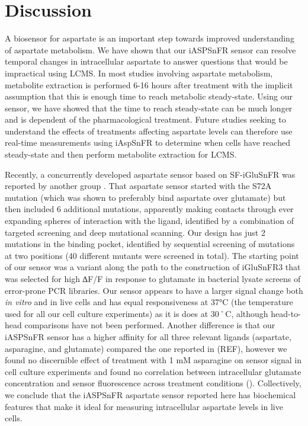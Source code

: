 \documentclass[9pt,lineno]{elife}
\begin{document}



\section{Discussion}
A biosensor for aspartate is an important step towards improved understanding of aspartate metabolism.
We have shown that our iASPSnFR sensor can resolve temporal changes in intracellular aspartate to answer questions that would be impractical using LCMS.
In most studies involving aspartate metabolism, metabolite extraction is performed 6-16 hours after treatment with the implicit assumption that this is enough time to reach metabolic steady-state.
Using our sensor, we have showed that the time to reach steady-state can be much longer and is dependent of the pharmacological treatment.
Future studies seeking to understand the effects of treatments affecting aspartate levels can therefore use real-time measurements using iAspSnFR to determine when cells have reached steady-state and then perform metabolite extraction for LCMS.

Recently, a concurrently developed aspartate sensor based on SF-iGluSnFR was reported by another group \citep{Hellweg2023}.
That aspartate sensor started with the S72A mutation (which was shown to preferably bind aspartate over glutamate) but then included 6 additional mutations, apparently making contacts through ever expanding spheres of interaction with the ligand, identified by a combination of targeted screening and deep mutational scanning.
Our design has just 2 mutations in the binding pocket, identified by sequential screening of mutations at two positions (40 different mutants were screened in total).
The starting point of our sensor was a variant along the path to the construction of iGluSnFR3 that was selected for high ∆F/F in response to glutamate in bacterial lysate screens of error-prone PCR libraries.
Our sensor appears to have a larger signal change both \textit{in vitro }and in live cells and has equal responsiveness at 37°C (the temperature used for all our cell culture experiments) as it is does at 30˚C, although head-to-head comparisons have not been performed.
Another difference is that our iASPSnFR sensor has a higher affinity for all three relevant ligands (aspartate, asparagine, and glutamate) compared the one reported in (REF), however we found no discernible effect of treatment with 1 mM asparagine on sensor signal in cell culture experiments and found no correlation between intracellular glutamate concentration and sensor fluorescence across treatment conditions ().
Collectively, we conclude that the iASPSnFR aspartate sensor reported here has biochemical features that make it ideal for measuring intracellular aspartate levels in live cells.
\end{document}
